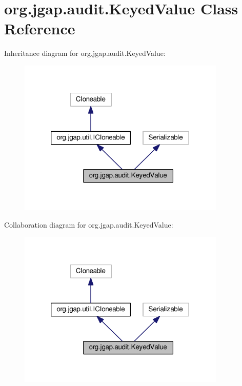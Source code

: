 \hypertarget{classorg_1_1jgap_1_1audit_1_1_keyed_value}{\section{org.\-jgap.\-audit.\-Keyed\-Value Class Reference}
\label{classorg_1_1jgap_1_1audit_1_1_keyed_value}
}


Inheritance diagram for org.\-jgap.\-audit.\-Keyed\-Value\-:
\nopagebreak
\begin{figure}[H]
\begin{center}
\leavevmode
\includegraphics[width=280pt]{classorg_1_1jgap_1_1audit_1_1_keyed_value__inherit__graph}
\end{center}
\end{figure}


Collaboration diagram for org.\-jgap.\-audit.\-Keyed\-Value\-:
\nopagebreak
\begin{figure}[H]
\begin{center}
\leavevmode
\includegraphics[width=280pt]{classorg_1_1jgap_1_1audit_1_1_keyed_value__coll__graph}
\end{center}
\end{figure}
